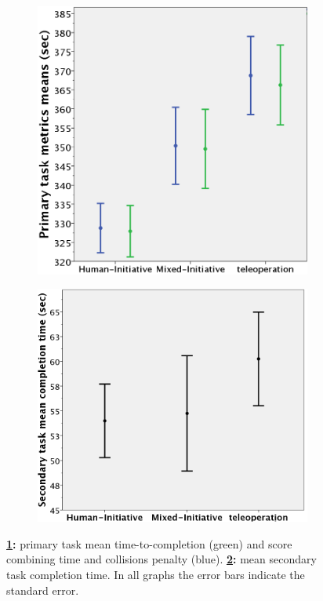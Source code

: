 \documentclass[a4paper,12pt,oneside,openright]{bhamthesis}
\begin{document}
	\begin{figure}
		\centering
		\begin{subfigure}[b]{0.46\textwidth}
			\centering
			\includegraphics[width=\textwidth]{chapter5_fig/exp3_primary_metrics.png}
			\caption{}
			\label{subfig:primary_metrics_exp3}
		\end{subfigure}
		\hfill
		\begin{subfigure}[b]{0.48\textwidth}
			\centering
			\includegraphics[width=\textwidth]{chapter5_fig/exp3_secondary_time.png}
			\caption{}
			\label{subfig:secondary_time_exp3}
		\end{subfigure}
		\hfill
		\caption{\textbf{\ref{subfig:primary_metrics_exp3}:} primary task mean time-to-completion (green) and score combining time and collisions penalty (blue). \textbf{\ref{subfig:secondary_time_exp3}:} mean secondary task completion time. In all graphs the error bars indicate the standard error.}
		\label{fig:exp3_primary_secondary}
	\end{figure}
	
\end{document}
